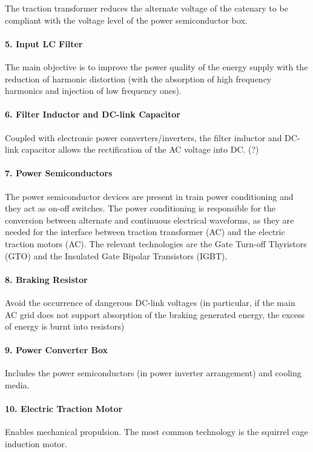 	The traction transformer reduces the alternate voltage of the catenary to be compliant with the voltage level of the power semiconductor box.
	
\paragraph{5. Input LC Filter\\}

	The main objective is to improve the power quality of the energy supply with the reduction of harmonic distortion (with the absorption of high frequency harmonics and injection of low frequency ones).

\paragraph{6. Filter Inductor and DC-link Capacitor\\}

	Coupled with electronic power converters/inverters, the filter inductor and DC-link capacitor allows the rectification of the AC voltage into DC. (?)
	
\paragraph{7. Power Semiconductors\\}

	The power semiconductor devices are present in train power conditioning and they act as on-off switches. The power conditioning is responsible for the conversion between alternate and continuous  electrical waveforms, as they are needed for the interface between traction transformer (AC) and the electric traction motors (AC). The relevant technologies are the Gate Turn-off Thyristors (GTO) and the Insulated Gate Bipolar Transistors (IGBT).

\paragraph{8. Braking Resistor\\}

	Avoid the occurrence of dangerous DC-link voltages (in particular, if the main AC grid does not support absorption of the braking generated energy, the excess of energy is burnt into resistors)

\paragraph{9. Power Converter Box\\}

	Includes the power semiconductors (in power inverter arrangement) and cooling media.

\paragraph{10. Electric Traction Motor\\}

	Enables mechanical propulsion. The most common technology is the squirrel cage induction motor.





